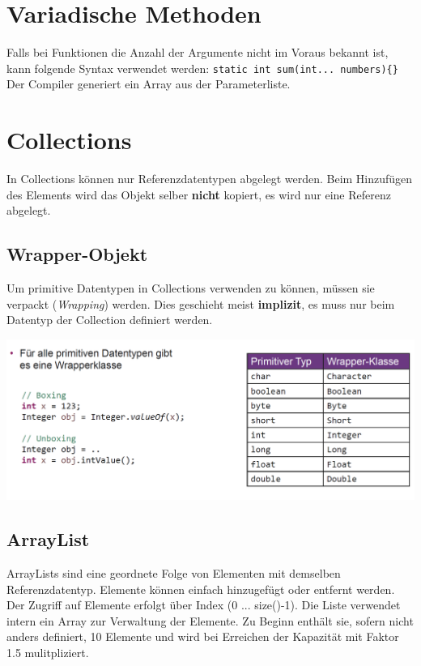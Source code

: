 \section{Variadische Methoden}
Falls bei Funktionen die Anzahl der Argumente nicht im Voraus bekannt ist, kann folgende
Syntax verwendet werden: \verb|static int sum(int... numbers){}|\\
Der Compiler generiert ein Array aus der Parameterliste.

\section{Collections}{\label{Collections}}
In Collections können nur Referenzdatentypen abgelegt werden. Beim Hinzufügen des Elements wird das Objekt selber \textbf{nicht} kopiert,
es wird nur eine Referenz abgelegt.

\subsection{Wrapper-Objekt}
Um primitive Datentypen in Collections verwenden zu können, müssen sie verpackt (\textit{Wrapping}) werden. Dies geschieht
meist \textbf{implizit}, es muss nur beim Datentyp der Collection definiert werden.
\begin{center}
    \includegraphics[width=0.9\columnwidth]{pictures/wrapper-klassen.png}
\end{center}

\subsection{ArrayList}
ArrayLists sind eine geordnete Folge von Elementen mit demselben Referenzdatentyp. Elemente können einfach 
hinzugefügt oder entfernt werden.\\
Der Zugriff auf Elemente erfolgt über Index (0 ... size()-1). Die Liste verwendet intern ein Array zur Verwaltung der Elemente.
Zu Beginn enthält sie, sofern nicht anders definiert, 10 Elemente und wird bei Erreichen der Kapazität mit Faktor 1.5 mulitpliziert.

